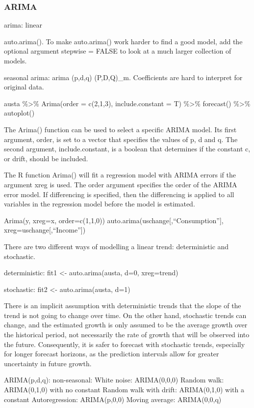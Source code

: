 \documentclass[]{book}
\begin{document}
\subsubsection{ARIMA}\label{arima}

arima: linear

auto.arima(). To make auto.arima() work harder to find a good model, add
the optional argument stepwise = FALSE to look at a much larger
collection of models.

seasonal arima: arima (p,d,q) (P,D,Q)\_m. Coefficients are hard to
interpret for original data.

austa \%\textgreater{}\% Arima(order = c(2,1,3), include.constant = T)
\%\textgreater{}\% forecast() \%\textgreater{}\% autoplot()

The Arima() function can be used to select a specific ARIMA model. Its
first argument, order, is set to a vector that specifies the values of
p, d and q. The second argument, include.constant, is a boolean that
determines if the constant c, or drift, should be included.

The R function Arima() will fit a regression model with ARIMA errors if
the argument xreg is used. The order argument specifies the order of the
ARIMA error model. If differencing is specified, then the differencing
is applied to all variables in the regression model before the model is
estimated.

Arima(y, xreg=x, order=c(1,1,0))
auto.arima(uschange{[},``Consumption''{]},
xreg=uschange{[},``Income''{]})

There are two different ways of modelling a linear trend: deterministic
and stochastic.

deterministic: fit1 \textless{}- auto.arima(austa, d=0, xreg=trend)

stochastic: fit2 \textless{}- auto.arima(austa, d=1)

There is an implicit assumption with deterministic trends that the slope
of the trend is not going to change over time. On the other hand,
stochastic trends can change, and the estimated growth is only assumed
to be the average growth over the historical period, not necessarily the
rate of growth that will be observed into the future. Consequently, it
is safer to forecast with stochastic trends, especially for longer
forecast horizons, as the prediction intervals allow for greater
uncertainty in future growth.

ARIMA(p,d,q): non-seasonal: White noise: ARIMA(0,0,0) Random walk:
ARIMA(0,1,0) with no constant Random walk with drift: ARIMA(0,1,0) with
a constant Autoregression: ARIMA(p,0,0) Moving average: ARIMA(0,0,q)
\end{document}
